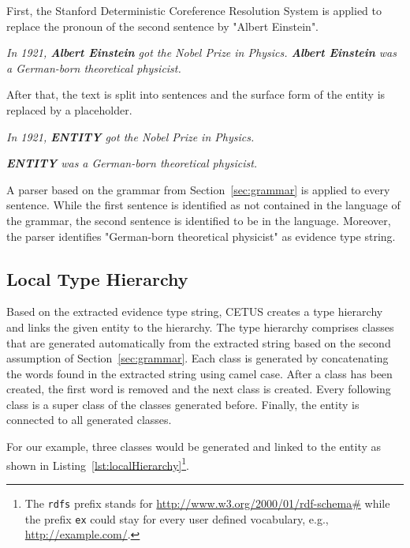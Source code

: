 First, the Stanford Deterministic Coreference Resolution System is applied to replace the pronoun of the second sentence by "Albert Einstein".

\begin{center}
\emph{In 1921, \textbf{Albert Einstein} got the Nobel Prize in Physics. \textbf{Albert Einstein} was a German-born theoretical physicist.}
\end{center}

After that, the text is split into sentences and the surface form of the entity is replaced by a placeholder.

\begin{center}
\emph{In 1921, \textbf{ENTITY} got the Nobel Prize in Physics.}

\emph{\textbf{ENTITY} was a German-born theoretical physicist.}
\end{center}

A parser based on the grammar from Section~\ref{sec:grammar} is applied to every sentence.
While the first sentence is identified as not contained in the language of the grammar, the second sentence is identified to be in the language.
Moreover, the parser identifies "German-born theoretical physicist" as evidence type string.

\subsection{Local Type Hierarchy}

Based on the extracted evidence type string, CETUS creates a type hierarchy and links the given entity to the hierarchy.
The type hierarchy comprises classes that are generated automatically from the extracted string based on the second assumption of Section~\ref{sec:grammar}.
Each class is generated by concatenating the words found in the extracted string using camel case.
After a class has been created, the first word is removed and the next class is created.
Every following class is a super class of the classes generated before.
Finally, the entity is connected to all generated classes.

For our example, three classes would be generated and linked to the entity as shown in Listing~\ref{lst:localHierarchy}\footnote{The \texttt{rdfs} prefix stands for \url{http://www.w3.org/2000/01/rdf-schema\#} while the prefix \texttt{ex} could stay for every user defined vocabulary, e.g., \url{http://example.com/}.}.

